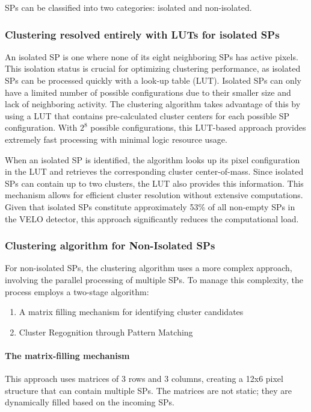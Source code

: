 SPs can be classified into two categories: isolated and non-isolated. 
\subsubsection{Clustering resolved entirely with LUTs for isolated SPs}
An isolated SP is one where none of its eight neighboring SPs has active pixels. This isolation status is crucial for optimizing clustering performance, as isolated SPs can be processed quickly with a look-up table (LUT). Isolated SPs can only have a limited number of possible configurations due to their smaller size and lack of neighboring activity. The clustering algorithm takes advantage of this by using a LUT that contains pre-calculated cluster centers for each possible SP configuration. With $2^8$ possible configurations, this LUT-based approach provides extremely fast processing with minimal logic resource usage.

When an isolated SP is identified, the algorithm looks up its pixel configuration in the LUT and retrieves the corresponding cluster center-of-mass. Since isolated SPs can contain up to two clusters, the LUT also provides this information. This mechanism allows for efficient cluster resolution without extensive computations. Given that isolated SPs constitute approximately 53\% of all non-empty SPs in the VELO detector, this approach significantly reduces the computational load.

\subsubsection{Clustering algorithm for Non-Isolated SPs}

For non-isolated SPs, the clustering algorithm uses a more complex approach, involving the parallel processing of multiple SPs. To manage this complexity, the process employs a two-stage algorithm\cite{Lazzari:2813167}:
\begin{enumerate}
    \item A matrix filling mechanism for identifying cluster candidates
    \item Cluster Regognition through Pattern Matching
\end{enumerate}
\paragraph{The matrix-filling mechanism}
This approach uses matrices of 3 rows and 3 columns, creating a 12x6 pixel structure that can contain multiple SPs. The matrices are not static; they are dynamically filled based on the incoming SPs.

